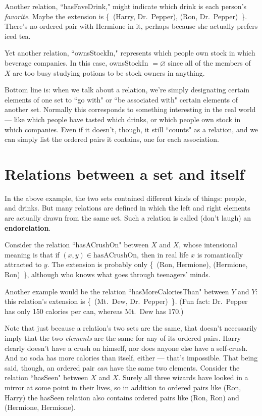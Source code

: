 Another relation, ``hasFaveDrink," might indicate which drink is each
person's \textit{favorite}. Maybe the extension is \{~(Harry,
Dr.~Pepper), (Ron, Dr.~Pepper)~\}. There's no ordered pair with Hermione
in it, perhaps because she actually prefers iced tea.

Yet another relation, ``ownsStockIn," represents which people own stock in
which beverage companies. In this case, ownsStockIn $=\varnothing$ since
all of the members of $X$ are too busy studying potions to be stock owners
in anything.

Bottom line is: when we talk about a relation, we're simply designating
certain elements of one set to ``go with" or ``be associated with"
certain elements of another set. Normally this corresponds to something
interesting in the real world --- like which people have tasted which
drinks, or which people own stock in which companies. Even if it doesn't,
though, it still ``counts" as a relation, and we can simply list the
ordered pairs it contains, one for each association.


\section{Relations between a set and itself}

In the above example, the two sets contained different kinds of things:
people, and drinks. But many relations are defined in which the left and
right elements are actually drawn from the same set. Such a relation is
called (don't laugh) an \textbf{endorelation}.

Consider the relation ``hasACrushOn" between $X$ and $X$, whose intensional
meaning is that if $(x,y)\in \text{hasACrushOn}$, then in real life $x$ is
romantically attracted to $y$. The extension is probably only \{~(Ron,
Hermione), (Hermione, Ron)~\}, although who knows what goes through
teenagers' minds.

Another example would be the relation ``hasMoreCaloriesThan" between $Y$
and $Y$: this relation's extension is \{~(Mt.~Dew, Dr.~Pepper)~\}. (Fun
fact: Dr.~Pepper has only 150 calories per can, whereas Mt.~Dew has 170.) 

Note that just because a relation's two sets are the same, that doesn't
necessarily imply that the two \textit{elements} are the same for any of
its ordered pairs. Harry clearly doesn't have a crush on himself, nor does
anyone else have a self-crush. And no soda has more calories than itself,
either --- that's impossible. That being said, though, an ordered pair
\textit{can} have the same two elements. Consider the relation ``hasSeen"
between $X$ and $X$. Surely all three wizards have looked in a mirror at
some point in their lives, so in addition to ordered pairs like (Ron,
Harry) the hasSeen relation also contains ordered pairs like (Ron, Ron) and
(Hermione, Hermione).


